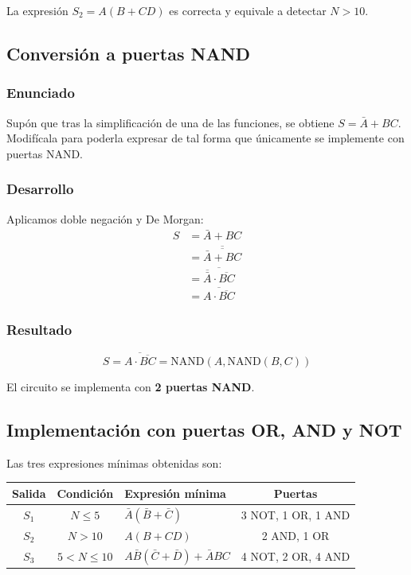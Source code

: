\documentclass[11pt,a4paper]{article}
\begin{document}
La expresión $S_2 = A(B + CD)$ es correcta y equivale a detectar $N > 10$.

\newpage

\subsection*{Conversión a puertas NAND}

\subsubsection*{Enunciado}
Supón que tras la simplificación de una de las funciones, se obtiene $S = \bar{A} + BC$. Modifícala para poderla expresar de tal forma que únicamente se implemente con puertas NAND.

\subsubsection*{Desarrollo}

Aplicamos doble negación y De Morgan:
\begin{align*}
S &= \bar{A} + BC \\
  &= \overline{\overline{\bar{A} + BC}} \\
  &= \overline{\overline{\bar{A}} \cdot \overline{BC}} \\
  &= \overline{A \cdot \overline{BC}}
\end{align*}

\subsubsection*{Resultado}

\[
\boxed{S = \overline{A \cdot \overline{BC}} = \text{NAND}(A, \text{NAND}(B, C))}
\]

El circuito se implementa con \textbf{2 puertas NAND}.

\newpage

\subsection*{Implementación con puertas OR, AND y NOT}

Las tres expresiones mínimas obtenidas son:

\begin{center}
\begin{tabular}{|c|c|l|c|}
\hline
\textbf{Salida} & \textbf{Condición} & \textbf{Expresión mínima} & \textbf{Puertas} \\
\hline
$S_1$ & $N \leq 5$ & $\bar{A}(\bar{B} + \bar{C})$ & 3 NOT, 1 OR, 1 AND \\
\hline
$S_2$ & $N > 10$ & $A(B + CD)$ & 2 AND, 1 OR \\
\hline
$S_3$ & $5 < N \leq 10$ & $A\bar{B}(\bar{C} + \bar{D}) + \bar{A}BC$ & 4 NOT, 2 OR, 4 AND \\
\hline
\end{tabular}
\end{center}
\end{document}
